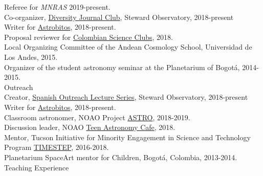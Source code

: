 \documentclass[UTF8]{article}
\begin{document}
\indent\indent Referee for \textit{MNRAS} 2019-present.\\ 
\indent\indent Co-organizer, \href{https://www.as.arizona.edu/diversity_coffee/}{Diversity Journal Club}, Steward Observatory, 2018-present\\
\indent\indent Writer for \href{https://astrobitos.org/}{Astrobitos}, 2018-present.\\ 
\indent\indent Proposal reviewer for \href{https://clubesdeciencia.co/}{Colombian Science Clubs}, 2018.\\
\indent\indent Local Organizing Committee of the Andean Cosmology School, Universidad de Los Andes, 2015.\\
\indent\indent Organizer of the student astronomy seminar at the Planetarium of Bogot\'a, 2014-2015.\\



{\Large Outreach}\\

\indent\indent Creator, \href{https://astrocharlas.github.io/}{Spanish Outreach Lecture Series}, Steward Observatory, 2018-present\\
\indent\indent Writer for \href{https://astrobitos.org/}{Astrobitos}, 2018-present.\\ 
\indent\indent Classroom astronomer, NOAO Project \href{https://www.noao.edu/education/astro/}{ASTRO}, 2018-2019.\\
\indent\indent Discussion leader, NOAO \href{http://www.teenastronomycafe.org/}{Teen Astronomy Cafe}, 2018.\\
\indent\indent Mentor, Tucson Initiative for Minority Engagement in Science and Technology Program \href{https://lavinia.as.arizona.edu/~timestep/}{TIMESTEP}, 2016-2018.\\
\indent\indent Planetarium SpaceArt mentor for Children, Bogot\'a, Colombia, 2013-2014.\\


{\Large Teaching Experience}\\
\end{document}
